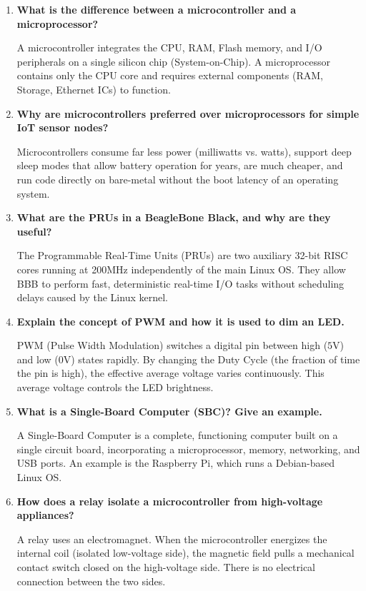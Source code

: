 \documentclass[12pt,a4paper]{article}
\newcommand{\Q}[1]{\textbf{#1}\par\noindent\ignorespaces}
\begin{document}
\vspace{6pt}

\begin{tcolorbox}[exambox, title={\textbf{Frequently Asked / Viva Questions}}]
\begin{enumerate}[leftmargin=*, topsep=0pt, label=\textbf{Q\arabic*.}, itemsep=6pt]
  \item \Q{What is the difference between a microcontroller and a microprocessor?}
        A microcontroller integrates the CPU, RAM, Flash memory, and I/O peripherals on a single silicon chip (System-on-Chip). A microprocessor contains only the CPU core and requires external components (RAM, Storage, Ethernet ICs) to function.
        
  \item \Q{Why are microcontrollers preferred over microprocessors for simple IoT sensor nodes?}
        Microcontrollers consume far less power (milliwatts vs. watts), support deep sleep modes that allow battery operation for years, are much cheaper, and run code directly on bare-metal without the boot latency of an operating system.
        
  \item \Q{What are the PRUs in a BeagleBone Black, and why are they useful?}
        The Programmable Real-Time Units (PRUs) are two auxiliary 32-bit RISC cores running at 200MHz independently of the main Linux OS. They allow BBB to perform fast, deterministic real-time I/O tasks without scheduling delays caused by the Linux kernel.
        
  \item \Q{Explain the concept of PWM and how it is used to dim an LED.}
        PWM (Pulse Width Modulation) switches a digital pin between high ($5\text{V}$) and low ($0\text{V}$) states rapidly. By changing the Duty Cycle (the fraction of time the pin is high), the effective average voltage varies continuously. This average voltage controls the LED brightness.
        
  \item \Q{What is a Single-Board Computer (SBC)? Give an example.}
        A Single-Board Computer is a complete, functioning computer built on a single circuit board, incorporating a microprocessor, memory, networking, and USB ports. An example is the Raspberry Pi, which runs a Debian-based Linux OS.
        
  \item \Q{How does a relay isolate a microcontroller from high-voltage appliances?}
        A relay uses an electromagnet. When the microcontroller energizes the internal coil (isolated low-voltage side), the magnetic field pulls a mechanical contact switch closed on the high-voltage side. There is no electrical connection between the two sides.
        

\end{enumerate}
\end{tcolorbox}
\end{document}
